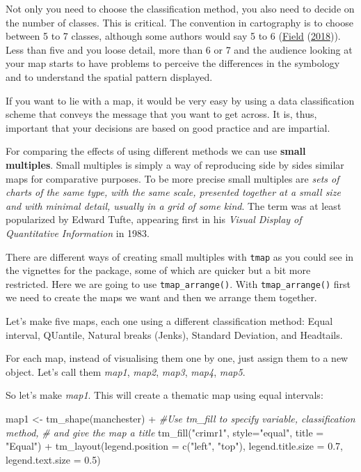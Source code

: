 \documentclass[
]{book}
\newenvironment{Shaded}{\begin{snugshade}}{\end{snugshade}}
\newcommand{\AttributeTok}[1]{\textcolor[rgb]{0.77,0.63,0.00}{#1}}
\newcommand{\CommentTok}[1]{\textcolor[rgb]{0.56,0.35,0.01}{\textit{#1}}}
\newcommand{\FloatTok}[1]{\textcolor[rgb]{0.00,0.00,0.81}{#1}}
\newcommand{\FunctionTok}[1]{\textcolor[rgb]{0.00,0.00,0.00}{#1}}
\newcommand{\NormalTok}[1]{#1}
\newcommand{\OtherTok}[1]{\textcolor[rgb]{0.56,0.35,0.01}{#1}}
\newcommand{\SpecialCharTok}[1]{\textcolor[rgb]{0.00,0.00,0.00}{#1}}
\newcommand{\StringTok}[1]{\textcolor[rgb]{0.31,0.60,0.02}{#1}}
\begin{document}
Not only you need to choose the classification method, you also need to decide on the number of classes. This is critical. The convention in cartography is to choose between 5 to 7 classes, although some authors would say 5 to 6 (\protect\hyperlink{ref-Field_2018}{Field} (\protect\hyperlink{ref-Field_2018}{2018})). Less than five and you loose detail, more than 6 or 7 and the audience looking at your map starts to have problems to perceive the differences in the symbology and to understand the spatial pattern displayed.

If you want to lie with a map, it would be very easy by using a data classification scheme that conveys the message that you want to get across. It is, thus, important that your decisions are based on good practice and are impartial.

For comparing the effects of using different methods we can use \textbf{small multiples}. Small multiples is simply a way of reproducing side by sides similar maps for comparative purposes. To be more precise small multiples are \emph{sets of charts of the same type, with the same scale, presented together at a small size and with minimal detail, usually in a grid of some kind}. The term was at least popularized by Edward Tufte, appearing first in his \emph{Visual Display of Quantitative Information} in 1983.

There are different ways of creating small multiples with \texttt{tmap} as you could see in the vignettes for the package, some of which are quicker but a bit more restricted. Here we are going to use \texttt{tmap\_arrange()}. With \texttt{tmap\_arrange()} first we need to create the maps we want and then we arrange them together.

Let's make five maps, each one using a different classification method: Equal interval, QUantile, Natural breaks (Jenks), Standard Deviation, and Headtails.

For each map, instead of visualising them one by one, just assign them to a new object. Let's call them \emph{map1}, \emph{map2}, \emph{map3}, \emph{map4}, \emph{map5}.

So let's make \emph{map1}. This will create a thematic map using equal intervals:

\begin{Shaded}
\begin{Highlighting}[]
\NormalTok{map1 }\OtherTok{\textless{}{-}} \FunctionTok{tm\_shape}\NormalTok{(manchester) }\SpecialCharTok{+}    
  \CommentTok{\#Use tm\_fill to specify variable, classification method, }
  \CommentTok{\# and give the map a title}
  \FunctionTok{tm\_fill}\NormalTok{(}\StringTok{"crimr1"}\NormalTok{, }\AttributeTok{style=}\StringTok{"equal"}\NormalTok{, }\AttributeTok{title =} \StringTok{"Equal"}\NormalTok{) }\SpecialCharTok{+} 
  \FunctionTok{tm\_layout}\NormalTok{(}\AttributeTok{legend.position =} \FunctionTok{c}\NormalTok{(}\StringTok{"left"}\NormalTok{, }\StringTok{"top"}\NormalTok{),   }
            \AttributeTok{legend.title.size =} \FloatTok{0.7}\NormalTok{,}
            \AttributeTok{legend.text.size =} \FloatTok{0.5}\NormalTok{)}
\end{Highlighting}
\end{Shaded}
\end{document}
